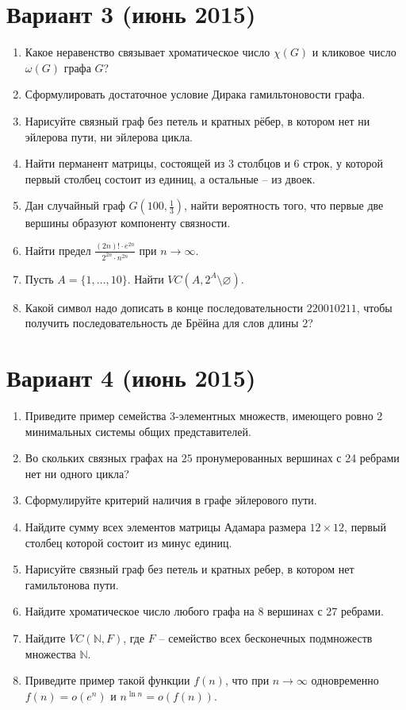 \documentclass[oneside]{book}
\begin{document}
\section{Вариант 3 (июнь 2015)}
\begin{enumerate}
\item Какое неравенство связывает хроматическое число $\chi(G)$ и кликовое число $\omega (G)$ графа $G$?
\item Сформулировать достаточное условие Дирака гамильтоновости графа.
\item Нарисуйте связный граф без петель и кратных рёбер, в котором нет ни эйлерова пути, ни эйлерова цикла. 
\item Найти перманент матрицы, состоящей из $3$ столбцов и $6$ строк, у которой первый столбец состоит из единиц, а остальные -- из двоек.
\item Дан случайный граф $G(100, \frac{1}{3})$, найти вероятность того, что первые две вершины образуют компоненту связности.
\item Найти предел $\displaystyle \frac{(2n)! \cdot e^{2n}} {2^{2n} \cdot n^{2n}}$ при $n \rightarrow \infty$.
\item Пусть $A = \{1, \ldots, 10\}$. Найти $VC(A, 2^{A} \setminus \varnothing)$.
\item Какой символ надо дописать в конце последовательности $220010211$, чтобы получить  последовательность де Брёйна для слов длины 2?
\end{enumerate}

\section{Вариант 4 (июнь 2015)}
\begin{enumerate}
\item Приведите пример семейства 3-элементных множеств, имеющего ровно 2 минимальных системы общих представителей.
\item Во скольких связных графах на $25$ пронумерованных вершинах с 24 ребрами нет ни одного цикла?
\item Сформулируйте критерий наличия в графе эйлерового пути.
\item Найдите сумму всех элементов матрицы Адамара размера $12 \times 12$, первый столбец которой состоит из минус единиц.
\item Нарисуйте связный граф без петель и кратных ребер, в котором нет гамильтонова пути.
\item Найдите хроматическое число любого графа на 8 вершинах с 27 ребрами.
\item Найдите $VC(\mathbb{N}, F)$, где $F$ -- семейство всех бесконечных подмножеств множества $\mathbb{N}$.
\item Приведите пример такой функции $f(n)$, что при $n \rightarrow \infty$ одновременно $f(n) = o(e^n)$ и $n^{\ln n} = o(f(n))$.
\end{enumerate}
\end{document}
